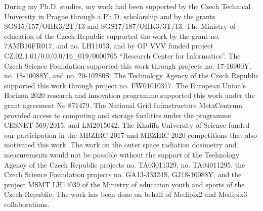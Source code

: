 During my Ph.D. studies, my work had been supported by the Czech Technical University in Prague through a Ph.D. scholarship and by the grants SGS15/157/OHK3/2T/13 and SGS17/187/OHK3/3T/13.
The Ministry of education of the Czech Republic supported the work by the grant no. 7AMB16FR017, and no. LH11053, and by OP VVV funded project CZ.02.1.01/0.0/0.0/16\_019/0000765 ``Research Center for Informatics''.
The Czech Science Foundation supported this work through projects no. 17-16900Y, no. 18-10088Y, and no. 20-10280S.
The Technology Agency of the Czech Republic supported this work through project no. FW01010317.
The European Union’s Horizon 2020 research and innovation programme supported this work under the grant agreement No 871479.
The National Grid Infrastructure MetaCentrum provided access to computing and storage facilities under the programme CESNET 569/2015, and LM2015042.
The Khalifa University of Science funded our participation in the MBZIRC 2017 and MBZIRC 2020 competitions that also motivated this work.
The work on the outer space radiation dosimetry and measurements would not be possible without the support of the Technology Agency of the Czech Republic projects no. TA03011329, no. TA04011295, the Czech Science Foundation projects no. GA13-33324S, GJ18-10088Y, and the project MSMT LH14039 of the Ministry of education youth and sports of the Czech Republic.
The work has been done on behalf of Medipix2 and Medipix3 collaborations.

\vspace{2.5cm}
